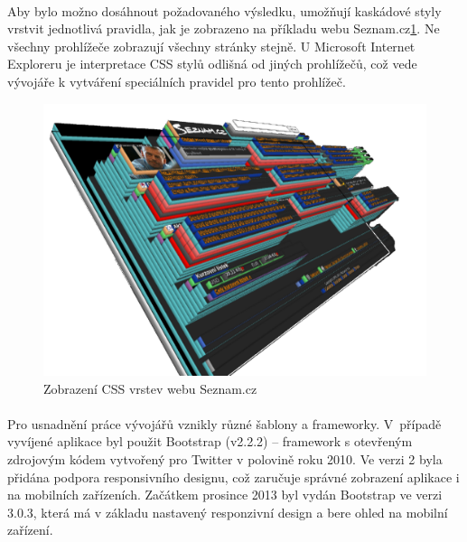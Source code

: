 \documentclass[11pt,a4paper,titlepage,oneside]{book}
\begin{document}
		\paragraph{} Aby bylo možno dosáhnout požadovaného výsledku, umožňují kaskádové styly vrstvit jednotlivá pravidla, jak je zobrazeno na příkladu webu Seznam.cz\ref{fig:seznam}. Ne všechny prohlížeče zobrazují všechny stránky stejně. U Microsoft Internet Exploreru je interpretace CSS stylů odlišná od jiných prohlížečů, což vede vývojáře k vytváření speciálních pravidel pro tento prohlížeč.
		\begin{figure}[!h]
			\begin{center}
				\includegraphics[width=12cm]{obrazky/css_vrstvy.png}
				\caption{Zobrazení CSS vrstev webu Seznam.cz}
				\label{fig:seznam}
			\end{center}
		\end{figure}	


		\paragraph{} Pro usnadnění práce vývojářů vznikly různé šablony a frameworky. V~pří\-padě vyvíjené aplikace byl použit Bootstrap (v2.2.2) -- framework s otevřeným zdrojovým kódem vytvořený pro Twitter v polovině roku 2010. Ve verzi 2 byla přidána podpora responsivního designu, což zaručuje správné zobrazení aplikace i na mobilních zařízeních. Začátkem prosince 2013 byl vydán Bootstrap ve verzi 3.0.3, která má v základu nastavený responzivní design a bere ohled na mobilní zařízení.
\end{document}
